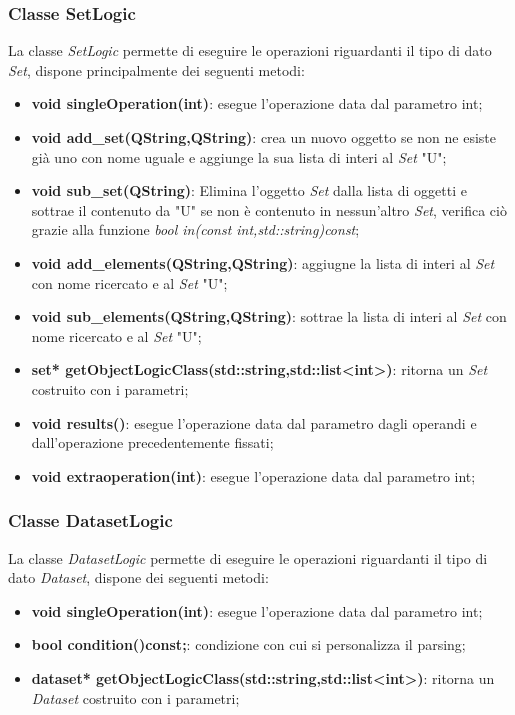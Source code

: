 \documentclass[a4paper,10pt]{article}
\begin{document}
            \subsubsection{Classe SetLogic}
            La classe \textit{SetLogic} permette di eseguire le operazioni riguardanti il tipo di dato \textit{Set}, dispone principalmente dei seguenti metodi:
            \begin{itemize}
                \item \textbf{void singleOperation(int)}: esegue l'operazione data dal parametro int;
                \item \textbf{void add\_set(QString,QString)}: crea un nuovo oggetto se non ne esiste già uno con nome uguale e aggiunge la sua lista di interi al \textit{Set} "U";
                \item \textbf{void sub\_set(QString)}: Elimina l'oggetto \textit{Set} dalla lista di oggetti e sottrae il contenuto da "U" se non è contenuto in nessun'altro \textit{Set}, verifica ciò grazie alla funzione \textit{bool in(const int,std::string)const};
                \item \textbf{void add\_elements(QString,QString)}: aggiugne la lista di interi al \textit{Set} con nome ricercato e al \textit{Set} "U";
                \item \textbf{void sub\_elements(QString,QString)}: sottrae la lista di interi al \textit{Set} con nome ricercato e al \textit{Set} "U";
                \item \textbf{set* getObjectLogicClass(std::string,std::list<int>)}: ritorna un \textit{Set} costruito con i parametri;
                \item \textbf{void results()}: esegue l'operazione data dal parametro dagli operandi e dall'operazione precedentemente fissati;
                \item \textbf{void extraoperation(int)}: esegue l'operazione data dal parametro int;
            \end{itemize}
    
            \subsubsection{Classe DatasetLogic}
            La classe \textit{DatasetLogic} permette di eseguire le operazioni riguardanti il tipo di dato \textit{Dataset}, dispone dei seguenti metodi:
            \begin{itemize}
                \item \textbf{void singleOperation(int)}: esegue l'operazione data dal parametro int;
                \item \textbf{bool condition()const;}: condizione con cui si personalizza il parsing;
                \item \textbf{dataset* getObjectLogicClass(std::string,std::list<int>)}: ritorna un \textit{Dataset} costruito con i parametri;
            \end{itemize}
    
\end{document}

